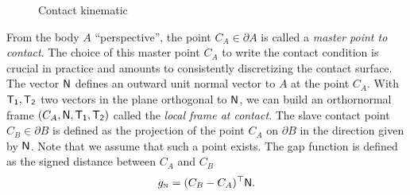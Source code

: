 {\begin{figure}[htb]
\caption{Contact kinematic}
\label{fig:local-frame}
\end{figure}

From the body $A$ ``perspective'', the point $C_{A} \in \partial A$ is called a \emph{master point to contact}.  The choice of this master point $C_A$ to write the contact condition is crucial in  practice and amounts to consistently discretizing  the contact surface. The vector  ${\sf N}$ defines an outward unit normal vector to $A$ at the point $C_A$. With $\sf T_1, T_2$ two vectors in the plane orthogonal to ${\sf N}$, we can build  an orthornormal frame $(C_A, \sf N, T_1, T_2)$ called the \emph{local frame at contact}. The slave contact point $C_B \in \partial B$ is defined as the projection of the point $C_A$ on $\partial B$ in the direction given by $\sf N$. Note that we assume that such a point exists. The gap function is defined as the signed distance between $C_A$ and $C_B$
\begin{equation}
  \label{eq:gap}
  g_{\n} = (C_B-C_A)^\top  \sf N.
\end{equation}


}
